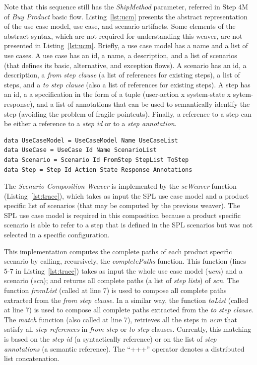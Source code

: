 \documentclass{acm_proc_article-sp}
\begin{document}
Note that this sequence still has  the \emph{ShipMethod} parameter, 
referred in Step 4M of \emph{Buy Product} basic flow. Listing~\ref{lst:ucm} presents the 
abstract representation of the use case model, use case, and scenario artifacts. 
Some elements of the abstract syntax, which are not required for understanding this weaver, 
are not presented in Listing~\ref{lst:ucm}. Briefly, a use case model has a name and a list of use cases. 
A use case has an id, a name, a description, and a list of scenarios (that defines its
basic, alternative, and exception flows). A scenario has an id, a
description, a \emph{from step clause} (a list of references for
existing steps), a list of steps, and a \emph{to step clause} (also
a list of references for existing steps). A step has an id, a
a specification in the form of a tuple
(user-action x system-state x sytem-response), and a list of annotations
that can be used to semantically identify the step (avoiding
the problem of fragile pointcuts). Finally, a reference to a step can be either a reference to a \emph{step id} or to a \emph{step annotation}.

\begin{lstlisting}[belowskip=10pt,frame=tb,caption={Use Case abstract syntax},label=lst:ucm]
data UseCaseModel = UseCaseModel Name UseCaseList
data UseCase = UseCase Id Name ScenarioList
data Scenario = Scenario Id FromStep StepList ToStep
data Step = Step Id Action State Response Annotations
\end{lstlisting}

The \emph{Scenario Composition Weaver} is implemented by the \emph{scWeaver} function (Listing~\ref{lst:trace}), which takes 
as input the SPL use case model and a product specific list of scenarios (that may be computed by the previous weaver). The SPL 
use case model is required in this composition because a product specific scenario is able to refer to a step that is defined in the 
SPL scenarios but was not selected in a specific configuration. 
 
This implementation computes the complete paths of each product specific 
scenario by calling, recursively, the \emph{completePaths} function. This 
function (lines 5-7 in Listing~\ref{lst:trace}) 
takes as input the whole use case model (\emph{ucm}) and a scenario (\emph{scn});
and returns all complete paths (a list of \emph{step lists}) of
\emph{scn}. The function \emph{fromList} (called at line 7) is used to
compose all complete paths extracted from the \emph{from step
clause}. In a similar way, the function \emph{toList} (called at
line 7) is used to compose all complete paths extracted from the
\emph{to step clause}. The \emph{match} function (also called at
line 7), retrieves all the steps in \emph{ucm} that satisfy all 
\emph{step references} in \emph{from step} or \emph{to step}
clauses. Currently, this matching is based on the \emph{step id} (a
syntactically reference) or on the list of \emph{step annotations}
(a semantic reference). The ``+++'' operator denotes a distributed
list concatenation.
\end{document}
